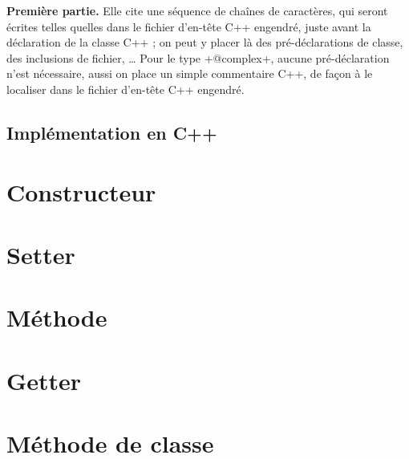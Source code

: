 \textbf{Première partie.} Elle cite une séquence de chaînes de caractères, qui seront écrites telles quelles dans le fichier d'en-tête C++ engendré, juste avant la déclaration de la classe C++ ; on peut y placer là des pré-déclarations de classe, des inclusions de fichier, … Pour le type \ggst+@complex+, aucune pré-déclaration n'est nécessaire, aussi on place un simple commentaire C++, de façon à le localiser dans le fichier d'en-tête C++ engendré.

\subsection{Implémentation en C++}






\section{Constructeur}


\section{Setter}


\section{Méthode}


\section{Getter}


\section{Méthode de classe}

